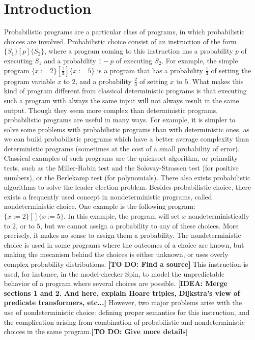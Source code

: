 \documentclass[a4paper,10pt]{llncs}
\newcommand\todo[1]{{\color{red}\textbf{[TO DO:  #1]}}}
\newcommand\idea[1]{{\color{purple}\textbf{[IDEA:  #1]}}}
\begin{document}
\section{Introduction}
\label{sec:intro}
Probabilistic programs are a particular class of programs, in which probabilistic choices are involved. Probabilistic choice consist of an instruction of the form $\{S_1\} [p] \{S_2\}$, where a program coming to this instruction has a probability $p$ of executing $S_1$ and a probability $1-p$ of executing $S_2$. For example, the simple program $\{ x := 2 \} [\frac{1}{3}] \{ x := 5 \}$ is a program that has a probability $\frac{1}{3}$ of setting the program variable $x$ to $2$, and a probability $\frac{2}{3}$ of setting $x$ to $5$. What makes this kind of program different from classical deterministic programs is that executing such a program with always the same input will not always result in the same output. Though they seem more complex than deterministic programs, probabilistic programs are useful in many ways. For example, it is simpler to solve some problems with probabilistic programs than with deterministic ones, as we can build probabilistic programs which have a better average complexity than deterministic programs (sometimes at the cost of a small probability of error). Classical examples of such programs are the quicksort algorithm, or primality tests, such as the Miller-Rabin test and the Solovay-Strassen test (for positive numbers), or the Berlekamp test (for polynomials). There also exists probabilistic algorithms to solve the leader election problem.\newline 
Besides probabilistic choice, there exists a frequently used concept in nondeterministic programs, called nondeterministic choice. One example is the following program: $\{ x := 2 \} [\!] \{ x := 5 \}$. In this example, the program will set $x$ nondeterministically to $2$, or to $5$, but we cannot assign a probability to any of these choices. More precisely, it makes no sense to assign them a probability. The nondeterministic choice is used in some programs where the outcomes of a choice are known, but making the mecanism behind the choices is either unknown, or uses overly complex probability distributions. \todo{Find a source} This instruction is used, for instance, in the model-checker Spin, to model the unpredictable behavior of a program where several choices are possible.\newline
\idea{Merge sections 1 and 2. And here, explain Hoare triples, Dijkstra's view of predicate transformers, etc...}
However, two major problems arise with the use of nondeterministic choice: defining proper semantics for this instruction, and the complication arising from combination of probabilistic and nondeterministic choices in the same program.\todo{Give more details}\newline
\end{document}
